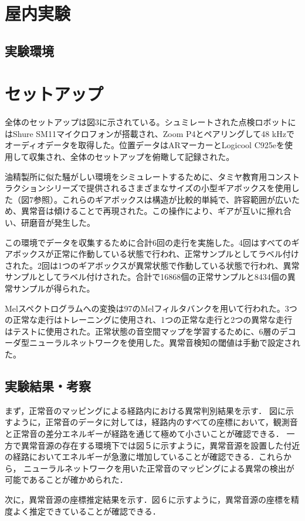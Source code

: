\documentclass[../main]{subfiles}
\begin{document}
\section{屋内実験}
\label{sec:vexp_spectral-reflectance}

\subsection{実験環境}
\label{subsec:vexp_ref_environmet}
\section{セットアップ}

全体のセットアップは図3に示されている。シュミレートされた点検ロボットにはShure SM11マイクロフォンが搭載され、Zoom P4とペアリングして48 kHzでオーディオデータを取得した。位置データはARマーカーとLogicool C925eを使用して収集され、全体のセットアップを俯瞰して記録された。

油精製所に似た騒がしい環境をシミュレートするために、タミヤ教育用コンストラクションシリーズで提供されるさまざまなサイズの小型ギアボックスを使用した（図7参照）。これらのギアボックスは構造が比較的単純で、許容範囲が広いため、異常音は傾けることで再現された。この操作により、ギアが互いに擦れ合い、研磨音が発生した。

この環境でデータを収集するために合計6回の走行を実施した。4回はすべてのギアボックスが正常に作動している状態で行われ、正常サンプルとしてラベル付けされた。2回は1つのギアボックスが異常状態で作動している状態で行われ、異常サンプルとしてラベル付けされた。合計で16868個の正常サンプルと8434個の異常サンプルが得られた。

Melスペクトログラムへの変換は97のMelフィルタバンクを用いて行われた。3つの正常な走行はトレーニングに使用され、1つの正常な走行と2つの異常な走行はテストに使用された。正常状態の音空間マップを学習するために、6層のデコーダ型ニューラルネットワークを使用した。異常音検知の閾値は手動で設定された。


\subsection{実験結果・考察}
まず，正常音のマッピングによる経路内における異常判別結果を示す．
図に示すように，正常音のデータに対しては，経路内のすべての座標において，観測音と正常音の差分エネルギーが経路を通じて極めて小さいことが確認できる．
一方で異常音源の存在する環境下では図５に示すように，異常音源を設置した付近の経路においてエネルギーが急激に増加していることが確認できる．これらから，
ニューラルネットワークを用いた正常音のマッピングによる異常の検出が可能であることが確かめられた．

次に，異常音源の座標推定結果を示す．図６に示すように，異常音源の座標を精度よく推定できていることが確認できる．
\label{subsec:vexp_ref_result}
\end{document}
